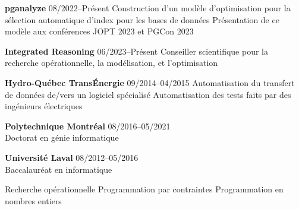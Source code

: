 \documentclass{memoir}
\begin{document}
\par
\vspace{1.5\baselineskip}
\begin{list}{}{
    \setlength\leftmargin{1.2in}
    \setlength\rightmargin{0in}
    \setlength{}
    \setlength{}
    \setlength\listparindent{0in}
    \setlength\itemindent{0in}
    \setlength\parskip{0in}
    \setlength\topsep{0in}
    \setlength\parsep{0in}
    \setlength\itemsep{0.90\baselineskip}
    \setlength\partopsep{0in}}

  


  \Item \textbf{pganalyze} \hfill 08/2022--Présent
  \BulletItem Construction d'un modèle d'optimisation pour la sélection automatique d'index pour les bases de données
  \BulletItem Présentation de ce modèle aux conférences JOPT 2023 et PGCon 2023

  \Item \textbf{Integrated Reasoning} \hfill 06/2023--Présent
  \BulletItem Conseiller scientifique pour la recherche opérationnelle, la modélisation, et l'optimisation
  


  \Item \textbf{Hydro-Québec TransÉnergie} \hfill 09/2014--04/2015
  \BulletItem Automatisation du transfert de données de/vers un logiciel spécialisé
  \BulletItem Automatisation des tests faits par des ingénieurs électriques

  

  \Item \textbf{Polytechnique Montréal} \hfill 08/2016--05/2021 \\
  Doctorat en génie informatique

  \Item \textbf{Université Laval} \hfill 08/2012--05/2016 \\
  Baccalauréat en informatique

  

  
  \BulletItem Recherche opérationnelle
  \BulletItem Programmation par contraintes
  \BulletItem Programmation en nombres entiers

  

\end{list}
\end{document}
